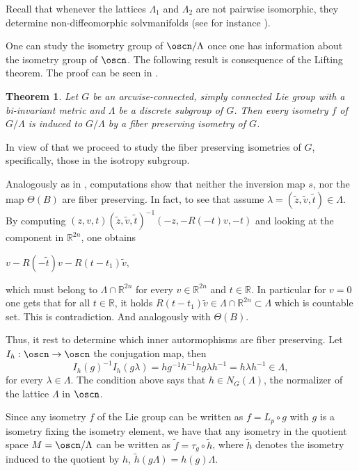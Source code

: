 \documentclass[12pt]{amsart}
\theoremstyle{plain}
\newtheorem{thm}{Theorem}[section]
\theoremstyle{definition}
\theoremstyle{remark}
\begin{document}
Recall that whenever the lattices $\Lambda_1$ and $\Lambda_2$ are not pairwise isomorphic, they determine non-diffeomorphic solvmanifolds (see for instance \cite{Ra}).

One can study the isometry group of $\oscn/\Lambda$ once one has information about the isometry group of $\oscn$. The following result is consequence of the Lifting theorem. The proof can be seen in \cite{BOV}.

\begin{thm} Let $G$ be an arcwise-connected, simply connected Lie group with a bi-invariant metric and $\Lambda$ be a discrete subgroup
of $G$. Then every isometry $f$ of $G/\Lambda$ is induced to $G/\Lambda$ by a fiber preserving isometry of $G$.
\end{thm}

In view of that we proceed to study the fiber preserving isometries of $G$, specifically, those in the isotropy subgroup.  


Analogously as in \cite{BOV}, computations show that neither the inversion map $s$, nor the map $\Theta(B)$ are fiber preserving.
In fact, to see that assume $\lambda=(\tilde{z},\tilde{v},\tilde{t})\in \Lambda$.  By computing 
		$(z,v,t)(\tilde{z},\tilde{v},\tilde{t})^{-1}(-z,-R(-t)v,-t)$ and looking at the component in $\mathbb R^{2n}$, one obtains 
				
		$v-R(-\tilde{t})v-R(t-t_1)\tilde{v},$ 
		
		which must belong to $\Lambda\cap \mathbb R^{2n}$ for every $v\in  \mathbb R^{2n}$ and $t\in \mathbb R$. In particular for $v=0$ one gets that for all $t\in \mathbb R$, it holds $R(t-t_1)\tilde{v}\in \Lambda\cap \mathbb R^{2n} \subset \Lambda$ which is countable set. This is contradiction. And analogously with $\Theta(B)$. 

Thus, it rest to determine which inner autormophisms are fiber preserving. Let $I_h: \oscn \to \oscn$ the conjugation map, then
$$I_h(g)^{-1}I_h(g\lambda)=hg^{-1}h^{-1} hg\lambda h^{-1}= h\lambda h^{-1}\in\Lambda,$$ for every $\lambda\in \Lambda$. The condition above says that  
  $h \in N_G(\Lambda)$, the normalizer of the lattice $\Lambda$ in $\oscn$. 

Since any isometry $f$ of the Lie group can be written as $f=L_p\circ g$ with $g$ is a isometry fixing the isometry element, we have that any isometry in the quotient space $M=\oscn/\Lambda$ can be written as $\tilde{f}=\tau_g\circ \tilde{h}$, where $\tilde{h}$ denotes the isometry induced to the quotient by $h$, $\tilde{h}(g\Lambda)=h(g)\Lambda$. 
\end{document}
